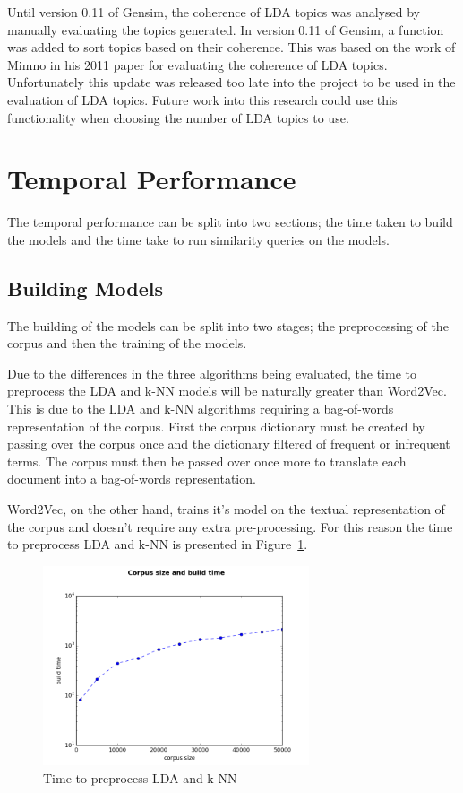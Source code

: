 Until version 0.11 of Gensim, the coherence of LDA topics was analysed by manually evaluating the topics generated.
In version 0.11 of Gensim, a function was added to sort topics based on their coherence.
This was based on the work of Mimno in his 2011 paper for evaluating the coherence of LDA topics\cite{Mimno}.
Unfortunately this update was released too late into the project to be used in the evaluation of LDA topics.
Future work into this research could use this functionality when choosing the number of LDA topics to use.

\section{Temporal Performance}
The temporal performance can be split into two sections; the time taken to build the models and the time take to run similarity queries on the models.

\subsection{Building Models}
The building of the models can be split into two stages;
the preprocessing of the corpus and then the training of the models.

Due to the differences in the three algorithms being evaluated, the time to preprocess the LDA and k-NN models will be naturally greater than Word2Vec.
This is due to the LDA and k-NN algorithms requiring a bag-of-words representation of the corpus.
First the corpus dictionary must be created by passing over the corpus once and the dictionary filtered of frequent or infrequent terms.
The corpus must then be passed over once more to translate each document into a bag-of-words representation.

Word2Vec, on the other hand, trains it's model on the textual representation of the corpus and doesn't require any extra pre-processing.
For this reason the time to preprocess LDA and k-NN is presented in Figure~\ref{fig:BuildBow}.

\begin{figure}[h]
    \centering
        \includegraphics[width=0.7\textwidth]{Figures/BuildBOW.png}
    \caption{Time to preprocess LDA and k-NN}
    \label{fig:BuildBow}
\end{figure}

